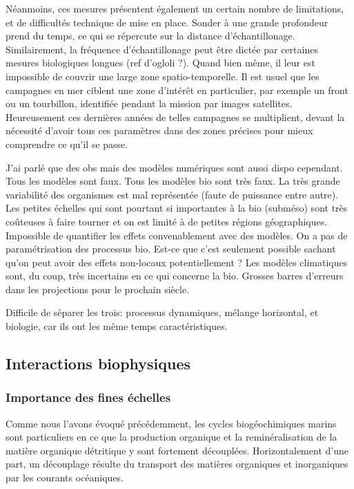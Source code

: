 Néanmoins, ces mesures présentent également un certain nombre de limitations, et de difficultés technique de mise en place.
Sonder à une grande profondeur prend du temps, ce qui se répercute sur la distance d'échantillonage.
Similairement, la fréquence d'échantillonage peut être dictée par certaines mesures biologiques longues (ref d'ogloli ?).
Quand bien même, il leur est impossible de couvrir une large zone spatio-temporelle.
Il est usuel que les campagnes en mer ciblent une zone d'intérêt en particulier, par exemple un front ou un tourbillon, identifiée pendant la mission par images satellites.
Heureusement ces dernières années de telles campagnes se multiplient, devant la nécessité d'avoir tous ces paramètres dans des zones précises pour mieux comprendre ce qu'il se passe.

J'ai parlé que des obs mais des modèles numériques sont aussi dispo cependant.
Tous les modèles sont faux. Tous les modèles bio sont très faux.
La très grande variabilité des organismes est mal représentée (faute de puissance entre autre). Les petites échelles qui sont pourtant si importantes à la bio (subméso) sont très coûteuses à faire tourner et on est limité à de petites régions géographiques. Impossible de quantifier les effets convenablement avec des modèles.
On a pas de paramétrisation des processus bio. Est-ce que c'est seulement possible sachant qu'on peut avoir des effets non-locaux potentiellement ?
Les modèles climatiques sont, du coup, très incertains en ce qui concerne la bio.
Grosses barres d'erreurs dans les projections pour le prochain siècle.

Difficile de séparer les trois: processus dynamiques, mélange horizontal, et biologie, car ils ont les même temps caractéristiques.

\subsection{Interactions biophysiques}
\label{sec:interactions-biophys}

\subsubsection{Importance des fines échelles}

Comme nous l'avons évoqué précédemment, les cycles biogéochimiques marins sont particuliers en ce que la production organique et la reminéralisation de la matière organique détritique y sont fortement découplées.
Horizontalement d'une part, un découplage résulte du transport des matières organiques et inorganiques par les courants océaniques.

